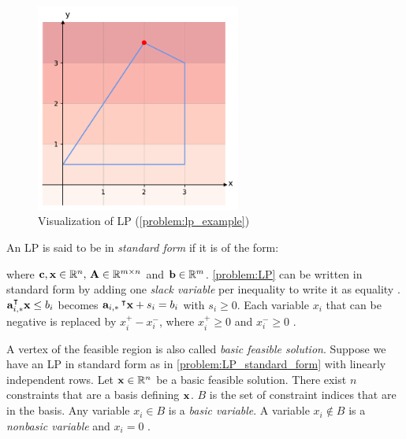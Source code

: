 \begin{figure}[h!]
    \centering
    \includegraphics[width=0.6\textwidth]{Images/lp.pdf}
    \caption{\label{fig:lp} Visualization of LP (\cref{problem:lp_example})}
\end{figure} 

An LP is said to be in \textit{standard form} if it is of the form:

\quad where $\bold c, \bold x \in \mathbb{R}^n, \, \bold A \in \mathbb{R}^{m \times n}$ and $\bold b \in \mathbb{R}^m$. 
\cref{problem:LP} can be written in standard form by adding one \textit{slack variable} per inequality to write it as equality \cite{noauthor_numerical_2006}. $\bold a_{i,*}^\intercal \bold x \leq b_i$ becomes $\bold a_{i,*} \,^\intercal \bold x + s_i = b_i$ with $s_i \geq 0$. Each variable $x_i$ that can be negative is replaced by $x_i^+ - x_i^-$, where $x_i^+ \geq 0$ and $x_i^- \geq 0$ \cite{noauthor_numerical_2006}.

A vertex of the feasible region is also called \textit{basic feasible solution}. Suppose we have an LP in standard form as in \cref{problem:LP_standard_form} with linearly independent rows. Let $\bold x \in \mathbb{R}^n$ be a basic feasible solution. There exist $n$ constraints that are a basis defining $\bold x$. $B$ is the set of constraint indices that are in the basis. Any variable $x_i \in B$ is a \textit{basic variable}. A variable $x_i \not \in B$ is a \textit{nonbasic variable} and $x_i=0$ \cite{understanding_lp}. 

